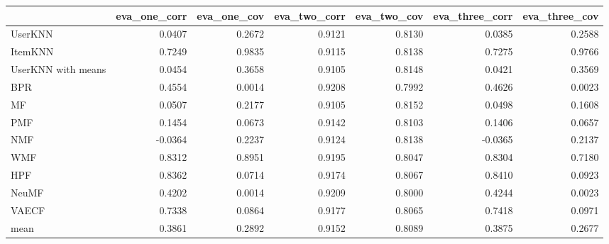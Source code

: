 \begin{tabular}{lrrrrrr}
\toprule
{} &  eva\_one\_corr &  eva\_one\_cov &  eva\_two\_corr &  eva\_two\_cov &  eva\_three\_corr &  eva\_three\_cov \\
\midrule
UserKNN            &        0.0407 &       0.2672 &        0.9121 &       0.8130 &          0.0385 &         0.2588 \\
ItemKNN            &        0.7249 &       0.9835 &        0.9115 &       0.8138 &          0.7275 &         0.9766 \\
UserKNN with means &        0.0454 &       0.3658 &        0.9105 &       0.8148 &          0.0421 &         0.3569 \\
BPR                &        0.4554 &       0.0014 &        0.9208 &       0.7992 &          0.4626 &         0.0023 \\
MF                 &        0.0507 &       0.2177 &        0.9105 &       0.8152 &          0.0498 &         0.1608 \\
PMF                &        0.1454 &       0.0673 &        0.9142 &       0.8103 &          0.1406 &         0.0657 \\
NMF                &       -0.0364 &       0.2237 &        0.9124 &       0.8138 &         -0.0365 &         0.2137 \\
WMF                &        0.8312 &       0.8951 &        0.9195 &       0.8047 &          0.8304 &         0.7180 \\
HPF                &        0.8362 &       0.0714 &        0.9174 &       0.8067 &          0.8410 &         0.0923 \\
NeuMF              &        0.4202 &       0.0014 &        0.9209 &       0.8000 &          0.4244 &         0.0023 \\
VAECF              &        0.7338 &       0.0864 &        0.9177 &       0.8065 &          0.7418 &         0.0971 \\
mean               &        0.3861 &       0.2892 &        0.9152 &       0.8089 &          0.3875 &         0.2677 \\
\bottomrule
\end{tabular}
